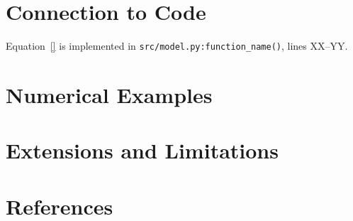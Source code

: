 \documentclass[11pt, a4paper]{article}
\theoremstyle{definition}
\theoremstyle{plain}
\theoremstyle{remark}
\begin{document}
\section{Connection to Code}

\begin{codelink}
    Equation~\eqref{} is implemented in \texttt{src/model.py:function\_name()},
    lines XX--YY.
\end{codelink}

\section{Numerical Examples}

\section{Extensions and Limitations}

\section{References}
\end{document}
